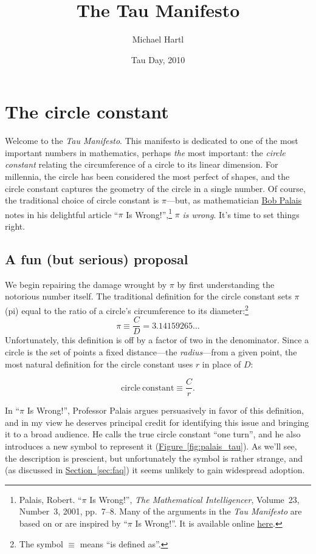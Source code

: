 \documentclass{article}
\begin{document}
\title{The Tau Manifesto}
\author{Michael Hartl}
\date{Tau Day, 2010}
\maketitle

\section{The circle constant} %
\label{sec:the_circle_constant}

Welcome to the \emph{Tau Manifesto}. This manifesto is dedicated to one of the most important numbers in mathematics, perhaps \emph{the} most important: the \emph{circle constant} relating the circumference of a circle to its linear dimension. For millennia, the circle has been considered the most perfect of shapes, and the circle constant captures the geometry of the circle in a single number. Of course, the traditional choice of circle constant is $\pi$---but, as mathematician \href{http://www.math.utah.edu/~palais/}{Bob Palais} notes in his delightful article ``$\pi$ Is Wrong!'',\footnote{Palais, Robert. ``$\pi$ Is Wrong!'', \emph{The Mathematical Intelligencer}, Volume~23, Number~3, 2001, pp.~7--8. Many of the arguments in the \emph{Tau Manifesto} are based on or are inspired by ``$\pi$ Is Wrong!''. It is available online \href{http://www.math.utah.edu/~palais/pi.html}{here}.} $\pi$ \emph{is wrong}. It's time to set things right.

  \subsection{A fun (but serious) proposal} %
  \label{sec:a_fun_serious_proposal}

We begin repairing the damage wrought by $\pi$ by first understanding the notorious number itself. The traditional definition for the circle constant sets $\pi$ (pi) equal to the ratio of a circle's circumference to its diameter:\footnote{The symbol $\equiv$ means ``is defined as''.}
\[
  \pi \equiv \frac{C}{D} = 3.14159265\ldots
\]
Unfortunately, this definition is off by a factor of two in the denominator. Since a circle is the set of points a fixed distance---the \emph{radius}---from a given point, the most natural definition for the circle constant uses $r$ in place of $D$:

\[
  \mathrm{circle\ constant} \equiv \frac{C}{r}.
\]

In ``$\pi$ Is Wrong!'', Professor Palais argues persuasively in favor of this definition, and in my view he deserves principal credit for identifying this issue and bringing it to a broad audience. He calls the true circle constant ``one turn'', and he also introduces a new symbol to represent it (\hyperref[fig:palais_tau]{Figure~}\ref{fig:palais_tau}). As we'll see, the description is prescient, but unfortunately the symbol is rather strange, and (as discussed in \hyperref[sec:faq]{Section~}\ref{sec:faq}) it seems unlikely to gain widespread adoption.
\end{document}
